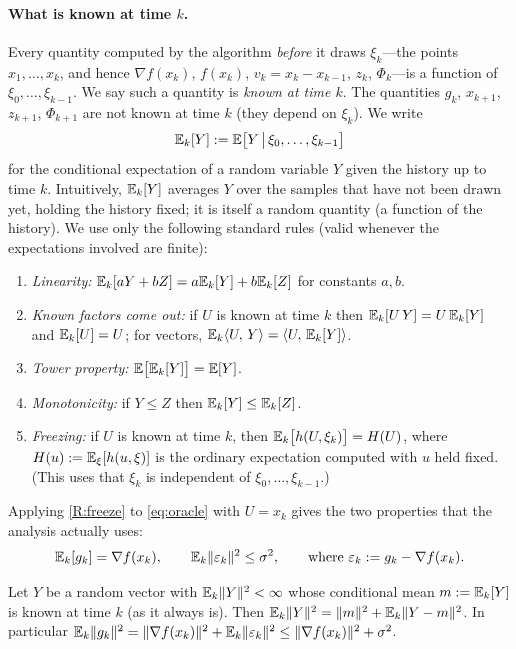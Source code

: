 \paragraph{What is known at time $k$.} Every quantity computed by the algorithm
\emph{before} it draws $\xi_k$---the points $x_1,\dots,x_k$, and hence $\nabla f(x_k)$,
$f(x_k)$, $v_k=x_k-x_{k-1}$, $z_k$, $\Phi_k$---is a function of $\xi_0,\dots,\xi_{k-1}$.
We say such a quantity is \emph{known at time $k$}. The quantities $g_k$, $x_{k+1}$,
$z_{k+1}$, $\Phi_{k+1}$ are not known at time $k$ (they depend on $\xi_k$). We write
\[
  \mathbb{E}_k[Y]:=\mathbb{E}\bigl[Y\,\big|\,\xi_0,\dots,\xi_{k-1}\bigr]
\]
for the conditional expectation of a random variable $Y$ given the history up to time $k$.
Intuitively, $\mathbb{E}_k[Y]$ averages $Y$ over the samples that have not been drawn yet, holding
the history fixed; it is itself a random quantity (a function of the history). We use only
the following standard rules (valid whenever the expectations involved are finite):
\begin{enumerate}[label=\textup{(R\arabic*)},leftmargin=3.2em]
\item\label{R:lin} \emph{Linearity:} $\mathbb{E}_k[aY+bZ]=a\mathbb{E}_k[Y]+b\mathbb{E}_k[Z]$ for constants $a,b$.
\item\label{R:known} \emph{Known factors come out:} if $U$ is known at time $k$ then
  $\mathbb{E}_k[U\,Y]=U\,\mathbb{E}_k[Y]$ and $\mathbb{E}_k[U]=U$; for vectors, $\mathbb{E}_k\langle U,\, Y\rangle=\langle U,\, \mathbb{E}_k[Y]\rangle$.
\item\label{R:tower} \emph{Tower property:} $\mathbb{E}\bigl[\mathbb{E}_k[Y]\bigr]=\mathbb{E}[Y]$.
\item\label{R:mono} \emph{Monotonicity:} if $Y\le Z$ then $\mathbb{E}_k[Y]\le\mathbb{E}_k[Z]$.
\item\label{R:freeze} \emph{Freezing:} if $U$ is known at time $k$, then
  $\mathbb{E}_k\bigl[h(U,\xi_k)\bigr]=H(U)$, where $H(u):=\mathbb{E}_\xi[h(u,\xi)]$ is the ordinary
  expectation computed with $u$ held fixed. (This uses that $\xi_k$ is independent of
  $\xi_0,\dots,\xi_{k-1}$.)
\end{enumerate}
Applying \ref{R:freeze} to \eqref{eq:oracle} with $U=x_k$ gives the two properties that
the analysis actually uses:
\begin{equation}\label{eq:cond-oracle}
  \mathbb{E}_k[g_k]=\nabla f(x_k),\qquad \mathbb{E}_k\lVert \varepsilon_k\rVert^2\le\sigma^2,
  \qquad\text{where }\varepsilon_k:=g_k-\nabla f(x_k).
\end{equation}

\begin{lemma}\label{lem:variance}
Let $Y$ be a random vector with $\mathbb{E}_k\lVert Y\rVert^2<\infty$ whose conditional mean $m:=\mathbb{E}_k[Y]$
is known at time $k$ (as it always is). Then $\mathbb{E}_k\lVert Y\rVert^2=\lVert m\rVert^2+\mathbb{E}_k\lVert Y-m\rVert^2$.
In particular $\mathbb{E}_k\lVert g_k\rVert^2=\lVert \nabla f(x_k)\rVert^2+\mathbb{E}_k\lVert \varepsilon_k\rVert^2
\le\lVert \nabla f(x_k)\rVert^2+\sigma^2$.
\end{lemma}

